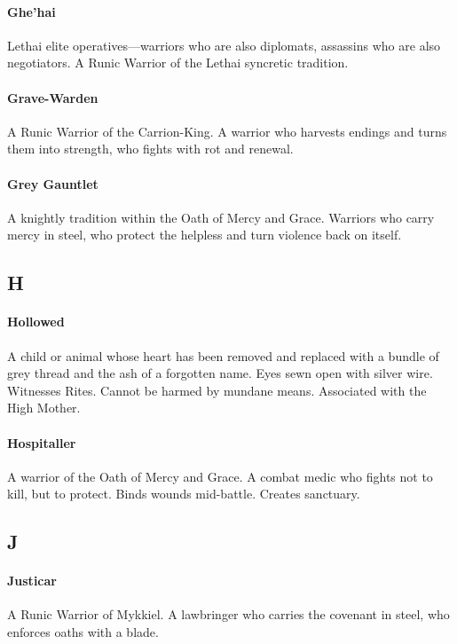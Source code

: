 \paragraph{Ghe'hai}
Lethai elite operatives—warriors who are also diplomats, assassins who are also negotiators. A Runic Warrior of the Lethai syncretic tradition.

\paragraph{Grave-Warden}
A Runic Warrior of the Carrion-King. A warrior who harvests endings and turns them into strength, who fights with rot and renewal.

\paragraph{Grey Gauntlet}
A knightly tradition within the Oath of Mercy and Grace. Warriors who carry mercy in steel, who protect the helpless and turn violence back on itself.

\subsection*{H}

\paragraph{Hollowed}
A child or animal whose heart has been removed and replaced with a bundle of grey thread and the ash of a forgotten name. Eyes sewn open with silver wire. Witnesses Rites. Cannot be harmed by mundane means. Associated with the High Mother.

\paragraph{Hospitaller}
A warrior of the Oath of Mercy and Grace. A combat medic who fights not to kill, but to protect. Binds wounds mid-battle. Creates sanctuary.

\subsection*{J}

\paragraph{Justicar}
A Runic Warrior of Mykkiel. A lawbringer who carries the covenant in steel, who enforces oaths with a blade.

